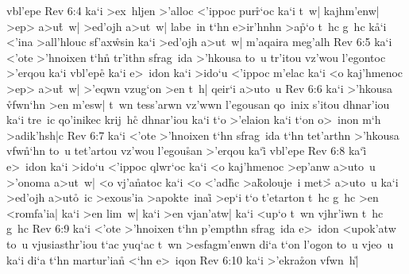 vbl'epe\bibvsend
\vs Rev 6:4
ka`i
>ex~hljen
>'alloc
<'ippoc
pur\r{r}`oc
ka`i
t~w|
kajhm'enw|
>ep>
a>u\r{t}~w|
>ed'ojh
a>ut~w|
labe~in
t`hn
e>ir'hnhn
>a\r{p}`o
t~hc
g~hc
k\r{a}`i
<'ina
>all'hlouc
sf'ax\r{w}sin
ka`i
>ed'ojh
a>ut~w|
m'aqaira
meg'alh\bibvsend
\vs Rev 6:5
ka`i
<'ote
>'hnoixen
t`hn\r{}
tr'ithn
sfrag~ida
>'hkousa
to~u
tr'itou
vz'wou
l'egontoc
>'erqou
ka`i
vbl'epe\r{}
ka`i
e>~idon
ka`i
>ido`u
<'ippoc
m'elac
ka`i
<o
kaj'hmenoc
>ep>
a>u\r{t}~w|
>'eqwn
vzug`on
>en
t~h|
qeir`i
a>uto~u\bibvsend
\vs Rev 6:6
ka`i
>'hkousa
\r{vf}wn`hn
>en
m'esw|
t~wn
tess'arwn
vz'wwn
l'egousan
qo~inix
s'itou
dhnar'iou
ka`i
tre~ic
qo'inikec
krij~h\r{c}
dhnar'iou
ka`i
t`o
>'elaion
ka`i
t`on
o>~inon
m`h
>adik'hsh|c\bibvsend
\vs Rev 6:7
ka`i
<'ote
>'hnoixen
t`hn
sfrag~ida
t`hn
tet'arthn
>'hkousa
vfw\r{n}`hn
to~u
tet'artou
vz'wou
l'egou\r{s}an
>'erqou
ka`i\r{}
vbl'epe\bibvsend
\vs Rev 6:8
ka`i\r{}
e>~idon
ka`i
>ido`u
<'ippoc
qlwr`oc
ka`i
<o
kaj'hmenoc
>ep'anw
a>uto~u
>'onoma
a>ut~w|
<o
vj'a\r{n}atoc
ka`i
<o
<'ad\r{h}c
>a\r{k}olouje~i
met>\r{}
a>uto~u
ka`i
>ed'ojh
a>ut\r{o}~ic
>exous'ia
>apokte~inai\r{}
>ep`i
t`o
t'etarton
t~hc
g~hc
>en
<romfa'ia|
ka`i
>en
lim~w|
ka`i
>en
vjan'atw|
ka`i
<up`o
t~wn
vjhr'iwn
t~hc
g~hc\bibvsend
\vs Rev 6:9
ka`i
<'ote
>'hnoixen
t`hn
p'empthn
sfrag~ida
e>~idon
<upok'atw
to~u
vjusiasthr'iou
t`ac
yuq`ac
t~wn
>esfagm'enwn
di`a
t`on
l'ogon
to~u
vjeo~u
ka`i
di`a
t`hn
martur'ia\r{n}
<`hn
e>~iqon\bibvsend
\vs Rev 6:10
ka`i
>'ekra\r{z}on
vfwn~h|\r{}

